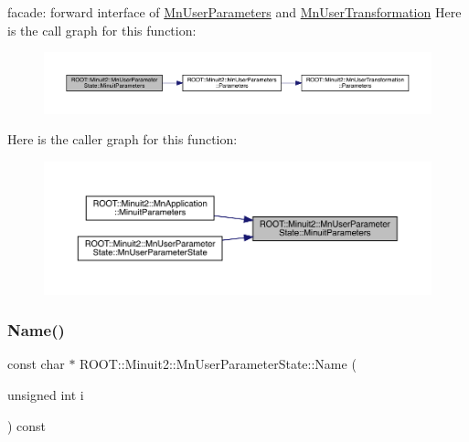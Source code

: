 facade\+: forward interface of \mbox{\hyperlink{classROOT_1_1Minuit2_1_1MnUserParameters}{Mn\+User\+Parameters}} and \mbox{\hyperlink{classROOT_1_1Minuit2_1_1MnUserTransformation}{Mn\+User\+Transformation}} Here is the call graph for this function\+:\nopagebreak
\begin{figure}[H]
\begin{center}
\leavevmode
\includegraphics[width=350pt]{d3/de0/classROOT_1_1Minuit2_1_1MnUserParameterState_aa9ad12f80ace3d55a1055b836293beec_cgraph}
\end{center}
\end{figure}
Here is the caller graph for this function\+:\nopagebreak
\begin{figure}[H]
\begin{center}
\leavevmode
\includegraphics[width=350pt]{d3/de0/classROOT_1_1Minuit2_1_1MnUserParameterState_aa9ad12f80ace3d55a1055b836293beec_icgraph}
\end{center}
\end{figure}
\mbox{\label{classROOT_1_1Minuit2_1_1MnUserParameterState_a9bb4ce8eb968c5112c3e33a0b7a32609}} 
\subsubsection{\texorpdfstring{Name()}{Name()}\hspace{0.1cm}{\footnotesize\ttfamily [1/2]}}
{\footnotesize\ttfamily const char $\ast$ R\+O\+O\+T\+::\+Minuit2\+::\+Mn\+User\+Parameter\+State\+::\+Name (\begin{DoxyParamCaption}\item[{unsigned int}]{i }\end{DoxyParamCaption}) const}


